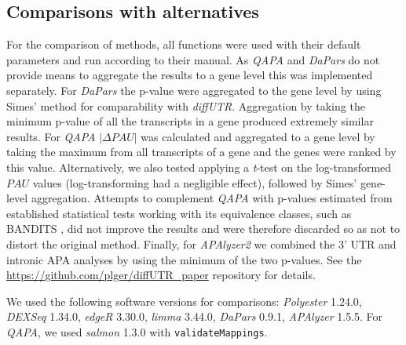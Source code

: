 \documentclass{bmcart}
\begin{document}
\subsection{Comparisons with alternatives}

For the comparison of methods, all functions were used with their default parameters and  run according to their manual. As \textit{QAPA} and \textit{DaPars} do not provide means to aggregate the results to a gene level this was implemented separately. For \textit{DaPars} the p-value were aggregated to the gene level by using Simes' method \cite{Simes1986AnSignificance} for comparability with \textit{diffUTR}. Aggregation by taking the minimum p-value of all the transcripts in a gene produced extremely similar results. For \textit{QAPA} $|\Delta PAU|$ was calculated and aggregated to a gene level by taking the maximum from all transcripts of a gene and the genes were ranked by this value. Alternatively, we also tested applying a \textit{t}-test on the log-transformed $PAU$ values (log-transforming had a negligible effect), followed by Simes' gene-level aggregation. Attempts to complement \textit{QAPA} with p-values estimated from established statistical tests working with its equivalence classes, such as BANDITS \cite{Tiberi2020BANDITS:Uncertainty}, did not improve the results and were therefore discarded so as not to distort the original method. Finally, for \textit{APAlyzer2} we combined the 3' UTR and intronic APA analyses by using the minimum of the two p-values. See the \url{https://github.com/plger/diffUTR_paper} repository for details.

We used the following software versions for comparisons: \textit{Polyester} 1.24.0, \textit{DEXSeq} 1.34.0, \textit{edgeR} 3.30.0, \textit{limma} 3.44.0, \textit{DaPars} 0.9.1, \textit{APAlyzer} 1.5.5. For \textit{QAPA}, we used \textit{salmon} 1.3.0 with \texttt{validateMappings}.


\end{document}
